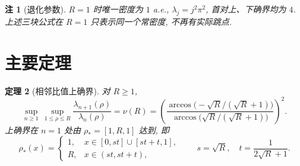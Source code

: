 \documentclass[UTF8]{ctexart}
\newtheorem{theorem}{定理}[section]
\newtheorem{remark}[theorem]{注}
\begin{document}
\begin{remark}[退化参数]
$R=1$ 时唯一密度为 $1$ a.e., $\lambda_j=j^2\pi^2$, 首对上、下确界均为 $4$.
上述三块公式在 $R=1$ 只表示同一个常密度, 不再有实际跳点.
\end{remark}

\section{主要定理}

\begin{theorem}[相邻比值上确界]
对 $R \geq 1$,
\begin{equation}
	\boxed{\; \sup_{n \geq 1}\, \sup_{1 \leq \rho \leq R} \frac{\lambda_{n+1}(\rho)}{\lambda_n(\rho)}
	= \nu(R) = \left( \frac{\arccos\!\bigl(-\sqrt{R}/(\sqrt{R}+1)\bigr)}
	{\arccos\!\bigl(\sqrt{R}/(\sqrt{R}+1)\bigr)} \right)^2 . \;}
\end{equation}
上确界在 $n = 1$ 处由 $\rho_* = [1, R, 1]$ 达到, 即
\[
	\rho_*(x) =
	\begin{cases}
		1, & x \in [0, st] \cup [st + t, 1], \\
		R, & x \in (st, st + t),
	\end{cases}
	\qquad s = \sqrt{R}, \quad t = \frac{1}{2\sqrt{R}+1}.
\]
\end{theorem}
\end{document}
